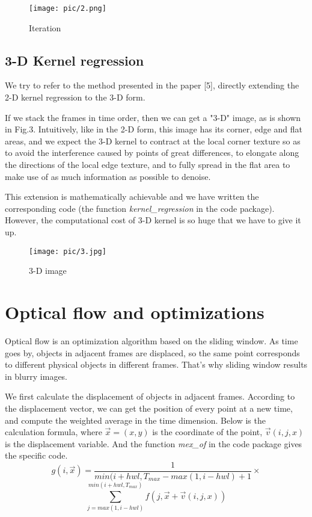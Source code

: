 \documentclass[10pt,twocolumn,letterpaper]{article}
\begin{document}
\begin{figure}[htp]
\texttt{[image: pic/2.png]}
\caption{Iteration}
\end{figure}

\subsection{3-D Kernel regression}

We try to refer to the method presented in the paper [5], directly extending the 2-D kernel regression to the 3-D form.

If we stack the frames in time order, then we can get a "3-D" image, as is shown in Fig.3. Intuitively, like in the 2-D form, this image has its corner, edge and flat areas, and we expect the 3-D kernel to contract at the local corner texture so as to avoid the interference caused by points of great differences, to elongate along the directions of the local edge texture, and to fully spread in the flat area to make use of as much information as possible to denoise.

This extension is mathematically achievable and we have written the corresponding code (the function \emph{kernel\_regression} in the code package). However, the computational cost of 3-D kernel is so huge that we have to give it up.

\begin{figure}[htp]
\texttt{[image: pic/3.jpg]}
\caption{3-D image}
\end{figure}

\section{Optical flow and optimizations}

Optical flow is an optimization algorithm based on the sliding window. As time goes by, objects in adjacent frames are displaced, so the same point corresponds to different physical objects in different frames. That’s why sliding window results in blurry images. 

We first calculate the displacement of objects in adjacent frames. According to the displacement vector, we can get the position of every point at a new time, and compute the weighted average in the time dimension. Below is the calculation formula, where $\Vec{x}=(x,y)$ is the coordinate of the point, $\Vec{v}(i,j,x)$ is the displacement variable. And the function \emph{mex\_of} in the code package gives the specific code.
$$g(i,\Vec{x}) = \frac{1}{min(i+hwl,T_{max}-max(1,i-hwl)+1}\times$$
$$\sum_{j=max(1,i-hwl)}^{min(i+hwl,T_{max})} f(j,\Vec{x}+\Vec{v}(i,j,x))$$
\end{document}
